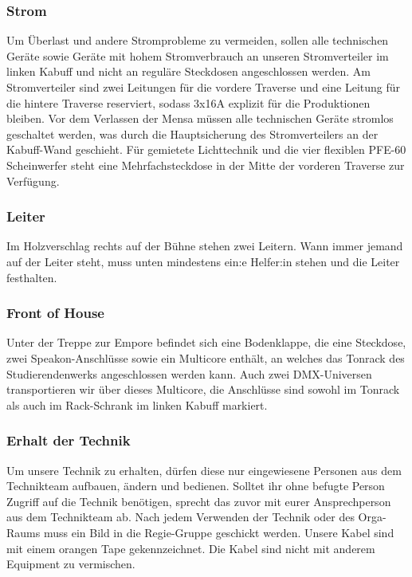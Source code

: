 \subsubsection{Strom}
Um Überlast und andere Stromprobleme zu vermeiden, sollen alle technischen Geräte sowie Geräte mit hohem Stromverbrauch an unseren Stromverteiler im linken Kabuff und nicht an reguläre Steckdosen angeschlossen werden. Am Stromverteiler sind zwei Leitungen für die vordere Traverse und eine Leitung für die hintere Traverse reserviert, sodass 3x16A explizit für die Produktionen bleiben.
Vor dem Verlassen der Mensa müssen alle technischen Geräte stromlos geschaltet werden, was durch die Hauptsicherung des Stromverteilers an der Kabuff-Wand geschieht.
Für gemietete Lichttechnik und die vier flexiblen PFE-60 Scheinwerfer steht eine Mehrfachsteckdose in der Mitte der vorderen Traverse zur Verfügung.

\subsubsection{Leiter}
Im Holzverschlag rechts auf der Bühne stehen zwei Leitern. Wann immer jemand auf der Leiter steht, muss unten mindestens ein:e Helfer:in stehen und die Leiter festhalten.

\subsubsection{Front of House}
Unter der Treppe zur Empore befindet sich eine Bodenklappe, die eine Steckdose, zwei Speakon-Anschlüsse sowie ein Multicore enthält, an welches das Tonrack des Studierendenwerks angeschlossen werden kann. Auch zwei DMX-Universen transportieren wir über dieses Multicore, die Anschlüsse sind sowohl im Tonrack als auch im Rack-Schrank im linken Kabuff markiert.	

\subsubsection{Erhalt der Technik}
Um unsere Technik zu erhalten, dürfen diese nur eingewiesene Personen aus dem Technikteam aufbauen, ändern und bedienen. Solltet ihr ohne befugte Person Zugriff auf die Technik benötigen, sprecht das zuvor mit eurer Ansprechperson aus dem Technikteam ab.	
Nach jedem Verwenden der Technik oder des Orga-Raums muss ein Bild in die Regie-Gruppe geschickt werden.	
Unsere Kabel sind mit einem orangen Tape gekennzeichnet. Die Kabel sind nicht mit anderem Equipment zu vermischen.	


